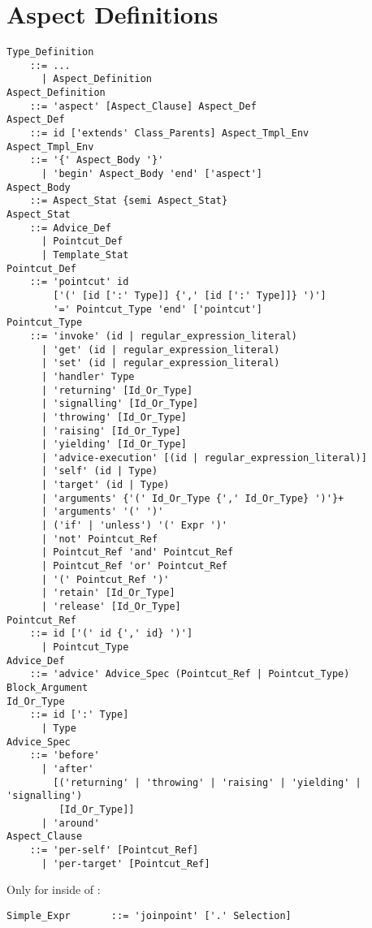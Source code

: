 \section{Aspect Definitions}
\label{sec:aspects}

\grammar\begin{lstlisting}
Type_Definition 
    ::= ...
      | Aspect_Definition
Aspect_Definition 
    ::= 'aspect' [Aspect_Clause] Aspect_Def
Aspect_Def
    ::= id ['extends' Class_Parents] Aspect_Tmpl_Env
Aspect_Tmpl_Env 
    ::= '{' Aspect_Body '}'
      | 'begin' Aspect_Body 'end' ['aspect']
Aspect_Body
    ::= Aspect_Stat {semi Aspect_Stat}
Aspect_Stat 
    ::= Advice_Def
      | Pointcut_Def
      | Template_Stat
Pointcut_Def 
    ::= 'pointcut' id
        ['(' [id [':' Type]] {',' [id [':' Type]]} ')']
        '=' Pointcut_Type 'end' ['pointcut']
Pointcut_Type 
    ::= 'invoke' (id | regular_expression_literal)
      | 'get' (id | regular_expression_literal)
      | 'set' (id | regular_expression_literal)
      | 'handler' Type
      | 'returning' [Id_Or_Type]
      | 'signalling' [Id_Or_Type]
      | 'throwing' [Id_Or_Type]
      | 'raising' [Id_Or_Type]
      | 'yielding' [Id_Or_Type]
      | 'advice-execution' [(id | regular_expression_literal)]
      | 'self' (id | Type)
      | 'target' (id | Type)
      | 'arguments' {'(' Id_Or_Type {',' Id_Or_Type} ')'}+
      | 'arguments' '(' ')'
      | ('if' | 'unless') '(' Expr ')'
      | 'not' Pointcut_Ref
      | Pointcut_Ref 'and' Pointcut_Ref
      | Pointcut_Ref 'or' Pointcut_Ref
      | '(' Pointcut_Ref ')'
      | 'retain' [Id_Or_Type]
      | 'release' [Id_Or_Type]
Pointcut_Ref 
    ::= id ['(' id {',' id} ')'] 
      | Pointcut_Type
Advice_Def 
    ::= 'advice' Advice_Spec (Pointcut_Ref | Pointcut_Type) Block_Argument
Id_Or_Type
    ::= id [':' Type] 
      | Type
Advice_Spec 
    ::= 'before' 
      | 'after' 
        [('returning' | 'throwing' | 'raising' | 'yielding' | 'signalling') 
         [Id_Or_Type]]
      | 'around'
Aspect_Clause
    ::= 'per-self' [Pointcut_Ref] 
      | 'per-target' [Pointcut_Ref] 
\end{lstlisting}

Only for  inside of :
\begin{lstlisting}
Simple_Expr       ::= 'joinpoint' ['.' Selection]
\end{lstlisting}








